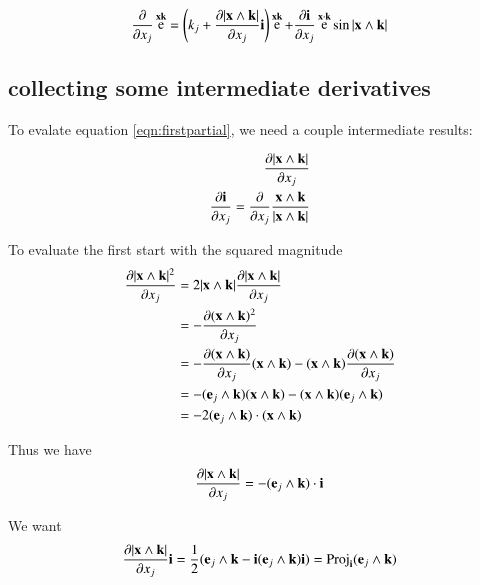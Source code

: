 \documentclass{article}      %
\newcommand{\dxj}[2] {\frac {\partial {#1}} {\partial {x_{#2}}}}
\DeclareMathOperator{\Exp}{e}
\begin{document}
\begin{equation}\label{eqn:firstpartial}
\dxj{}{j}\Exp^{\Bx\Bk}
= 
\left(k_j + \dxj{\abs{\Bx \wedge \Bk}}{j}\Bi\right) \Exp^{\Bx\Bk} + \dxj{\Bi}{j} \Exp^{\Bx \cdot \Bk} \sin{\abs{\Bx \wedge \Bk}}
\end{equation}

\subsection{ collecting some intermediate derivatives }

To evalate equation \ref{eqn:firstpartial}, we need a couple intermediate results:

\begin{align*}
\dxj{\abs{\Bx \wedge \Bk}}{j} \\
\dxj{\Bi}{j} = \dxj{}{j} \frac{\Bx \wedge \Bk}{\abs{\Bx \wedge \Bk}} \\
\end{align*}

To evaluate the first start with the squared magnitude
\begin{align*}
\dxj{\abs{\Bx \wedge \Bk}^2}{j} 
&= 2 {\abs{\Bx \wedge \Bk}} \dxj{\abs{\Bx \wedge \Bk}}{j} \\
&= -\dxj{(\Bx \wedge \Bk)^2}{j} \\
&= - \dxj{(\Bx \wedge \Bk)}{j} (\Bx \wedge \Bk) - (\Bx \wedge \Bk) \dxj{(\Bx \wedge \Bk)}{j} \\
&= - (\Be_j \wedge \Bk) (\Bx \wedge \Bk) - (\Bx \wedge \Bk) (\Be_j \wedge \Bk) \\
&= - 2 (\Be_j \wedge \Bk) \cdot (\Bx \wedge \Bk) \\
\end{align*}

Thus we have
\begin{equation}\label{eqn:partialabs}
\dxj{\abs{\Bx \wedge \Bk}}{j} = - (\Be_j \wedge \Bk) \cdot \Bi
\end{equation}

We want 
\[
\dxj{\abs{\Bx \wedge \Bk}}{j}\Bi
= \inv{2} ( \Be_j \wedge \Bk - \Bi (\Be_j \wedge \Bk) \Bi )
= \Proj_{\Bi}(\Be_j \wedge \Bk)
\]
\end{document}
